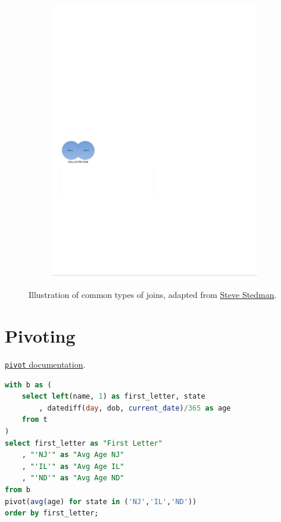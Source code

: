 \begin{figure}[H]
\begin{subfigure}[c]{0.3\textwidth}
  \includegraphics[width=\textwidth]{figures/sql/full_outer_join}
  \label{fig:sql:joins:full_outer_join}
  \end{subfigure}
\caption{
Illustration of common types of joins, adapted from \href{http://stevestedman.com/2015/03/sql-server-join-types-poster-version-2}{Steve Stedman}.
}
\label{fig:sql:joins}
\end{figure}

\section{Pivoting}
\label{ssql:pivoting}

\noindent \href{https://docs.snowflake.com/en/sql-reference/constructs/pivot.html}{\texttt{pivot} documentation}.

\begin{lstlisting}[language=SQL]
with b as (
	select left(name, 1) as first_letter, state
		, datediff(day, dob, current_date)/365 as age
	from t
)
select first_letter as "First Letter"
	, "'NJ'" as "Avg Age NJ"
	, "'IL'" as "Avg Age IL"
	, "'ND'" as "Avg Age ND"
from b
pivot(avg(age) for state in ('NJ','IL','ND'))
order by first_letter;
\end{lstlisting}

